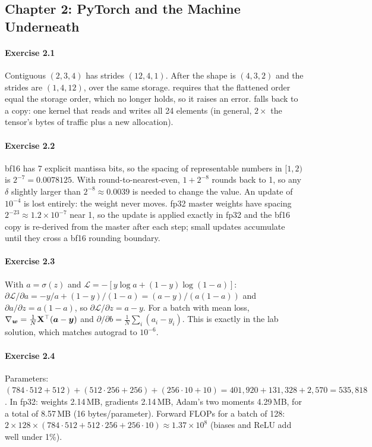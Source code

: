 \subsection*{Chapter 2: PyTorch and the Machine Underneath}

\paragraph{Exercise 2.1}
Contiguous $(2,3,4)$ has strides $(12,4,1)$. After  the shape is $(4,3,2)$ and the strides
are $(1,4,12)$, over the same storage.  requires that the flattened order equal the storage order,
which no longer holds, so it raises an error.  falls back to a copy: one kernel that reads and
writes all 24 elements (in general, $2\times$ the tensor's bytes of traffic plus a new allocation).

\paragraph{Exercise 2.2}
bf16 has 7 explicit mantissa bits, so the spacing of representable numbers in $[1,2)$ is $2^{-7}=0.0078125$. With
round-to-nearest-even, $1+2^{-8}$ rounds back to 1, so any $\delta$ slightly larger than $2^{-8}\approx0.0039$ is needed to
change the value. An update of $10^{-4}$ is lost entirely: the weight never moves. fp32 master weights have
spacing $2^{-23}\approx1.2\times10^{-7}$ near 1, so the update is applied exactly in fp32 and the bf16 copy is
re-derived from the master after each step; small updates accumulate until they cross a bf16 rounding
boundary.

\paragraph{Exercise 2.3}
With $a=\sigma(z)$ and $\mathcal{L}=-[y\log a+(1-y)\log(1-a)]$:
$\partial\mathcal{L}/\partial a = -y/a + (1-y)/(1-a) = (a-y)/(a(1-a))$ and $\partial a/\partial z=a(1-a)$, so
$\partial\mathcal{L}/\partial z=a-y$. For a batch with mean loss, $\nabla_{\bm{w}}=\frac1N\mathbf{X}^\top(\bm{a}-\bm{y})$
and $\partial/\partial b=\frac1N\sum_i(a_i-y_i)$. This is exactly  in the lab
solution, which matches autograd to $10^{-6}$.

\paragraph{Exercise 2.4}
Parameters: $(784\cdot512+512)+(512\cdot256+256)+(256\cdot10+10)=401{,}920+131{,}328+2{,}570=535{,}818$. In fp32:
weights 2.14\,MB, gradients 2.14\,MB, Adam's two moments 4.29\,MB, for a total of 8.57\,MB (16 bytes/parameter). Forward
FLOPs for a batch of 128: $2\times128\times(784\cdot512+512\cdot256+256\cdot10)\approx1.37\times10^8$ (biases and ReLU add
well under 1\%).

